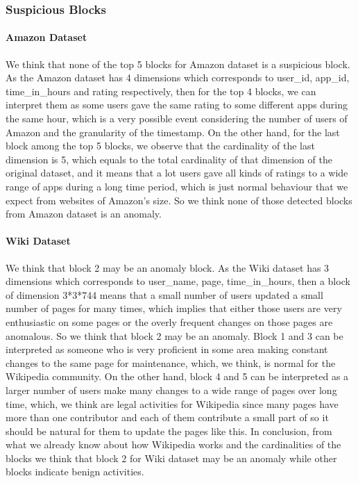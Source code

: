 \subsubsection{Suspicious Blocks}
\paragraph{Amazon Dataset} We think that none of the top 5 blocks for Amazon dataset is a suspicious block. As the Amazon dataset has 4 dimensions which corresponds to user\_id, app\_id, time\_in\_hours and rating respectively, then
for the top 4 blocks, we can interpret them as some users gave the same rating to some different apps during the same hour, which is a very possible event considering the number of users of Amazon and the granularity of the timestamp.
On the other hand, for the last block among the top 5 blocks, we observe that the cardinality of the last dimension is 5, which equals to the total cardinality of that dimension of the original dataset,
and it means that a lot users gave all kinds of ratings to a wide range of apps during a long time period, which is just normal behaviour that we expect from websites of Amazon's size.
So we think none of those detected blocks from Amazon dataset is an anomaly.
\paragraph{Wiki Dataset} We think that block 2 may be an anomaly block. As the Wiki dataset has 3 dimensions which corresponds to user\_name, page, time\_in\_hours, then a block of dimension 3*3*744 means that a small number of users
updated a small number of pages for many times, which implies that either those users are very enthusiastic on some pages or the overly frequent changes on those pages are anomalous. So we think that block 2 may be an anomaly.
Block 1 and 3 can be interpreted as someone who is very proficient in some area making constant changes to the same page for maintenance, which, we think, is normal for the Wikipedia community. On the other hand, block 4 and 5 can be
interpreted as a larger number of users make many changes to a wide range of pages over long time, which, we think are legal activities for Wikipedia since many pages have more than one contributor and each of them contribute a small
part of so it should be natural for them to update the pages like this. In conclusion, from what we already know about how Wikipedia works and the cardinalities of the blocks we think that block 2 for Wiki dataset may be an anomaly while
other blocks indicate benign activities.
